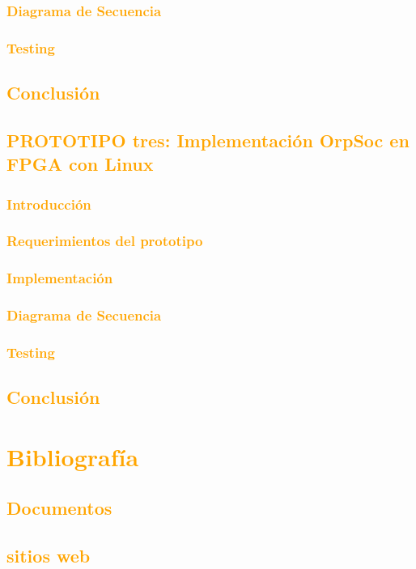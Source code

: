 \documentclass[a4paper,11pt]{article}
\begin{document}
			\subsubsection{\textcolor{orange}{Diagrama de Secuencia}}
			\subsubsection{\textcolor{orange}{Testing}}
		\subsection{\textcolor{orange}{Conclusión}}
	\subsection{\textcolor{orange}{PROTOTIPO tres: Implementación OrpSoc en FPGA con Linux}}
		\subsubsection{\textcolor{orange}{Introducción}}
		\subsubsection{\textcolor{orange}{Requerimientos del prototipo}}
		\subsubsection{\textcolor{orange}{Implementación}}
			\subsubsection{\textcolor{orange}{Diagrama de Secuencia}}
			\subsubsection{\textcolor{orange}{Testing}}
		\subsection{\textcolor{orange}{Conclusión}}




	


\section{\textcolor{orange}{Bibliografía}}
\subsection{\textcolor{orange}{Documentos}}
\subsection{\textcolor{orange}{sitios web}}
\end{document}
